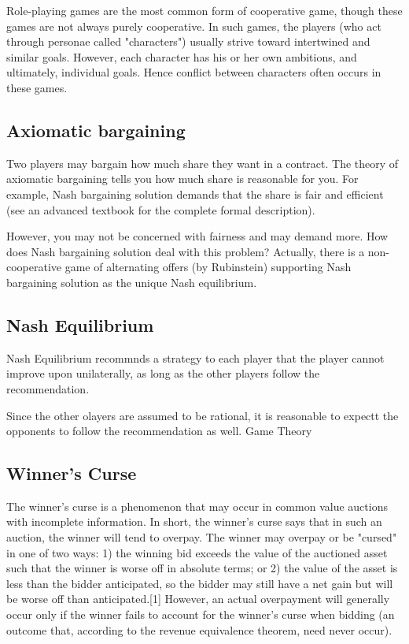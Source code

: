 Role-playing games are the most common form of cooperative game, though these games are not always purely cooperative. In such games, the players (who act through personae called "characters") usually strive toward intertwined and similar goals. However, each character has his or her own ambitions, and ultimately, individual goals. Hence conflict between characters often occurs in these games.

\subsection{Axiomatic bargaining}
Two players may bargain how much share they want in a contract. The theory of axiomatic bargaining tells you how much share is reasonable for you. For example, Nash bargaining solution demands that the share is fair and efficient (see an advanced textbook for the complete formal description).

However, you may not be concerned with fairness and may demand more. How does Nash bargaining solution deal with this problem? Actually, there is a non-cooperative game of alternating offers (by Rubinstein) supporting Nash bargaining solution as the unique Nash equilibrium.



\subsection{Nash Equilibrium}

Nash Equilibrium recommnds a strategy to each player that the player cannot improve upon unilaterally, as long as the other players follow the recommendation.

Since the other olayers are assumed to be rational, it is reasonable to expectt the opponents to follow the recommendation as well.
Game Theory

\subsection{Winner's Curse}
The winner's curse is a phenomenon that may occur in common value auctions with incomplete information. In short, the winner's curse says that in such an auction, the winner will tend to overpay. The winner may overpay or be "cursed" in one of two ways: 1) the winning bid exceeds the value of the auctioned asset such that the winner is worse off in absolute terms; or 2) the value of the asset is less than the bidder anticipated, so the bidder may still have a net gain but will be worse off than anticipated.[1] However, an actual overpayment will generally occur only if the winner fails to account for the winner's curse when bidding (an outcome that, according to the revenue equivalence theorem, need never occur).
